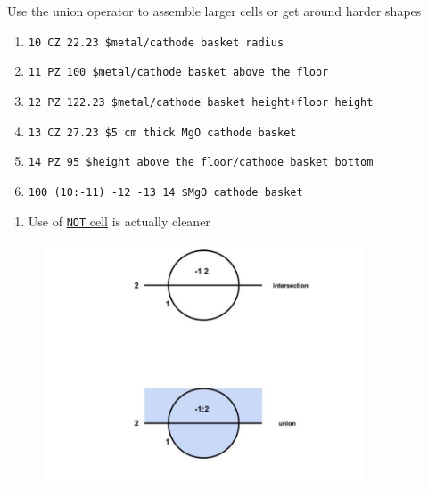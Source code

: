 \documentclass[aspectratio=1610,pdftex,dvipsnames,compress,xcolor={dvipsnames}]{beamer}
\begin{document}
\begin{frame}{Use the union operator to assemble larger cells or get around harder shapes}
    \small
    \begin{enumerate}[series=outerlist,topsep=0pt,itemsep=1pt,leftmargin=*,label=(\arabic*)]
        \item[]\texttt{10     CZ  22.23         \$metal/cathode basket radius}
        \item[]\texttt{11     PZ  100           \$metal/cathode basket above the floor}
        \item[]\texttt{12     PZ  122.23        \$metal/cathode basket height+floor height}
        \item[]\texttt{13     CZ  27.23         \$5 cm thick MgO cathode basket}
        \item[]\texttt{14     PZ  95            \$height above the floor/cathode basket bottom}
            \vspace{0.10in}
        \item[]\texttt{100    (10:-11)  -12 -13 14   \$MgO cathode basket}
    \end{enumerate}
    \normalsize
    \begin{enumerate}[series=outerlist,topsep=19pt,itemsep=21pt,leftmargin=*,label=(\arabic*)]
        \item[]Use of \href{https://github.com/TheDoctorRAB/igem}{\texttt{NOT} cell} is actually cleaner 
    \end{enumerate}
\end{frame}


\begin{frame}{}
    \begin{figure}
        \centering
        \includegraphics[width=0.85\textwidth]{mcnp_surface.union.jpg}
    \end{figure}
\end{frame}
\end{document}
